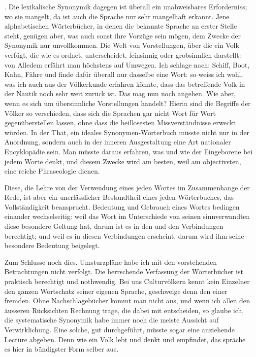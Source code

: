 . Die lexikalische Synonymik dagegen ist überall ein unabweisbares Erforderniss; wo sie mangelt, da ist auch die Sprache nur sehr mangelhaft erkannt. Jene alphabetischen Wörterbücher, in denen die bekannte Sprache an erster Stelle steht, genügen aber, was auch sonst ihre Vorzüge sein mögen, dem Zwecke der Synonymik nur unvollkommen. Die Welt von Vorstellungen, über die ein Volk verfügt, die  wie es ordnet, unterscheidet, feinsinnig oder grobsinnlich darstellt: von Alledem erfährt man höchstens auf Umwegen. Ich schlage nach: Schiff, Boot, Kahn, Fähre und finde dafür überall nur dasselbe eine Wort: so weiss ich wohl, was ich auch aus der Völkerkunde erfahren könnte, dass das betreffende Volk in der Nautik noch sehr weit zurück ist. Das mag nun noch angehen. Wie aber, wenn es sich um übersinnliche Vorstellungen handelt? Hierin sind die Begriffe der Völker so verschieden, dass sich die Sprachen gar nicht Wort für Wort gegenüberstellen lassen, ohne dass die heillosesten Missverständnisse erweckt würden. In der That, ein ideales Synonymen-Wörterbuch müsste nicht nur in der Anordnung, sondern auch in der inneren Ausgestaltung eine Art nationaler Encyklopädie sein. Man müsste daraus erfahren, was und \label{sp.125} wie der Eingeborene bei jedem Worte denkt, und diesem Zwecke wird am besten, weil am objectivsten, eine reiche Phraseologie dienen.

Diese, die Lehre von der Verwendung eines jeden Wortes im Zusammenhange der Rede, ist aber ein unerlässlicher Bestandtheil eines jeden Wörterbuches, das Vollständigkeit beansprucht. Bedeutung und Gebrauch eines Wortes bedingen einander wechselseitig: weil das Wort im Unterschiede von seinen sinnverwandten diese besondere Geltung hat, darum ist es in den und den Verbindungen berechtigt; und weil es in diesen Verbindungen erscheint, darum wird ihm seine besondere Bedeutung beigelegt.

Zum Schlusse noch dies. Umsturzpläne habe ich mit den vorstehenden Betrachtungen nicht verfolgt. Die herrschende Verfassung der \label{fp.133} Wörterbücher ist praktisch berechtigt und nothwendig. Bei uns Culturvölkern kennt kein Einzelner den ganzen Wortschatz seiner eigenen Sprache, geschweige denn den einer fremden. Ohne Nachschlagebücher kommt man nicht aus, und wenn ich allen den äusseren Rücksichten Rechnung trage, die dabei mit entscheiden, so glaube ich, die systematische Synonymik habe immer noch die meiste Aussicht auf Verwirklichung. Eine solche, gut durchgeführt, müsste sogar eine anziehende Lectüre abgeben. Denn wie ein Volk lebt und denkt und empfindet, das spräche es hier in bündigster Form selber aus.

